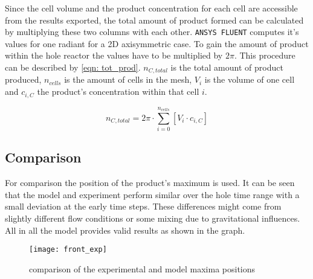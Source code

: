\documentclass[../thesis.tex]{subfiles}
\begin{document}
Since the cell volume and the product concentration for each cell are accessible from the results exported, the total amount of product formed can be calculated by multiplying these two columns with each other. \texttt{ANSYS FLUENT} computes it's values for one radiant for a 2D axisymmetric case. To gain the amount of product within the hole reactor the values have to be multiplied by $2 \pi$. This procedure can be described by \autoref{eqn: tot_prod}. $ n_{C, total} $ is the total amount of product produced, $n_{cells}$ is the amount of cells in the mesh, $ V_i $ is the volume of one cell and $c_{i, C}$ the product's concentration within that cell $i$.

\begin{equation}
	n_{C, total} = 2 \pi \cdot \sum_{i=0}^{n_{cells}} \left[ V_i \cdot c_{i, C} \right]
	\label{eqn: tot_prod} 
\end{equation}

\subsection{Comparison}

For comparison the position of the product's maximum is used. It can be seen that the model and experiment perform similar over the hole time range with a small deviation at the early time steps. These differences might come from slightly different flow conditions or some mixing due to gravitational influences. All in all the model provides valid results as shown in the graph.
\begin{figure}[htbp]
	\centering
	\texttt{[image: front\_exp]}
	\caption{comparison of the experimental and model maxima positions}
	\label{fig: comp_maxis}
\end{figure}
\end{document}
